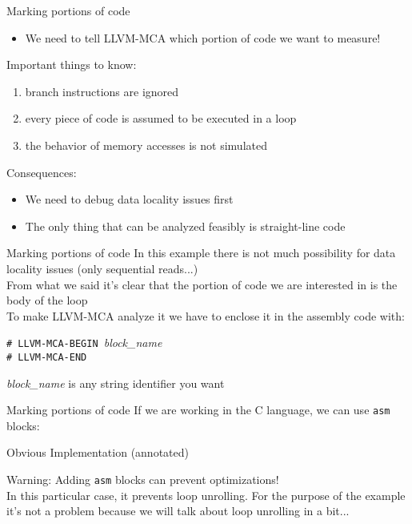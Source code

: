 \begin{frame}{Marking portions of code}
\begin{itemize}
\item We need to tell LLVM-MCA which portion of code we want to measure!
\end{itemize}
\bigskip
Important things to know:
\begin{enumerate}
\item branch instructions are ignored
\item every piece of code is assumed to be executed in a loop
\item the behavior of memory accesses is not simulated
\end{enumerate}
\bigskip
Consequences:
\begin{itemize}
\item We need to debug data locality issues \alert{first}
\item The only thing that can be analyzed feasibly is straight-line code
\end{itemize}
\end{frame}


\begin{frame}{Marking portions of code}
In this example there is not much possibility for data locality
issues (only sequential reads...)\\
\bigskip
From what we said it's clear that the portion of code we are interested
in is the \alert{body of the loop}\\
\medskip
To make LLVM-MCA analyze it we have to enclose it \alert{in the assembly code}
with:\\
\smallskip
\begin{center}
\large
\texttt{\# LLVM-MCA-BEGIN }\textit{block\_name}\\
\smallskip
\texttt{\# LLVM-MCA-END}
\end{center}
\smallskip
{\footnotesize \textit{block\_name} is any string identifier you want}
\end{frame}


\begin{frame}{Marking portions of code}
If we are working in the C language, we can use \texttt{asm} blocks:
\begin{block}{Obvious Implementation (annotated)}
\end{block}
\bigskip
\alert{Warning:} Adding \texttt{asm} blocks can prevent optimizations!\\
\smallskip
{\footnotesize In this particular case, it prevents \alert{loop unrolling}.
For the purpose of the example it's not a problem because we will talk about
loop unrolling in a bit...}
\end{frame}


